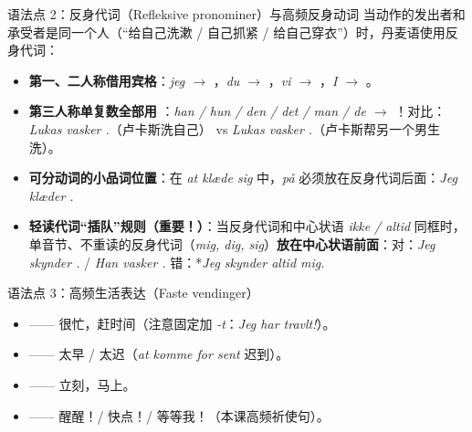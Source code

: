 \begin{grammatikbox}{语法点 2：反身代词（Refleksive pronominer）与高频反身动词}
当动作的发出者和承受者是同一个人（“给自己洗漱 / 自己抓紧 / 给自己穿衣”）时，丹麦语使用反身代词：
\begin{itemize}
  \item \textbf{第一、二人称借用宾格}：\textit{jeg $\rightarrow$ }，\textit{du $\rightarrow$ }，\textit{vi $\rightarrow$ }，\textit{I $\rightarrow$ }。
  \item \textbf{第三人称单复数全部用 }：\textit{han / hun / den / det / man / de $\rightarrow$ }！\newline 对比：\textit{Lukas vasker .}（卢卡斯洗自己） vs \textit{Lukas vasker .}（卢卡斯帮另一个男生洗）。
  \item \textbf{可分动词的小品词位置}：在 \textit{at klæde sig } 中，\textit{på} 必须放在反身代词后面：\textit{Jeg klæder  .}
  \item \textbf{轻读代词“插队”规则（重要！）}：当反身代词和中心状语 \textit{ikke / altid} 同框时，单音节、不重读的反身代词（\textit{mig, dig, sig}）\textbf{放在中心状语前面}：\newline 对：\textit{Jeg skynder  .} / \textit{Han vasker  .} \quad 错：*\textit{Jeg skynder altid mig.}
\end{itemize}
\end{grammatikbox}

\begin{grammatikbox}{语法点 3：高频生活表达（Faste vendinger）}
\begin{itemize}
  \item {} —— 很忙，赶时间（注意固定加 \textit{-t}：\textit{Jeg har travlt!}）。
  \item {} —— 太早 / 太迟（\textit{at komme for sent} 迟到）。
  \item {} —— 立刻，马上。
  \item {} —— 醒醒！/ 快点！/ 等等我！（本课高频祈使句）。
\end{itemize}
\end{grammatikbox}


